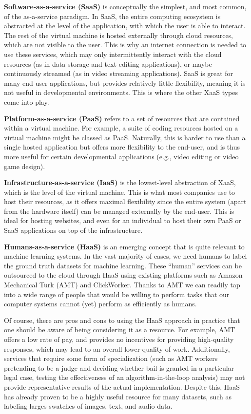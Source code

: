{{{{{\textbf{Software-as-a-service (SaaS)} is conceptually the simplest, and most common, of the as-a-service paradigm. In SaaS, the entire computing ecosystem is abstracted at the level of the application, with which the user is able to interact. The rest of the virtual machine is hosted externally through cloud resources, which are not visible to the user. This is why an internet connection is needed to use these services, which may only intermittently interact with the cloud resources (as in data storage and text editing applications), or maybe continuously streamed (as in video streaming applications). SaaS is great for many end-user applications, but provides relatively little flexibility, meaning it is not useful in developmental environments. This is where the other XaaS types come into play.

\textbf{Platform-as-a-service (PaaS)} refers to a set of resources that are contained within a virtual machine. For example, a suite of coding resources hosted on a virtual machine might be classed as PaaS. Naturally, this is harder to use than a single hosted application but offers more flexibility to the end-user, and is thus more useful for certain developmental applications (e.g., video editing or video game design).

\textbf{Infrastructure-as-a-service (IaaS)} is the lowest-level abstraction of XaaS, which is the level of the virtual machine. This is what most companies use to host their resources, as it offers maximal flexibility since the entire system (apart from the hardware itself) can be managed externally by the end-user. This is ideal for hosting websites, and even for an individual to host their own PaaS or SaaS applications on top of the infrastructure.

\textbf{Humans-as-a-service (HaaS)} is an emerging concept that is quite relevant to machine learning systems. In the vast majority of cases, we need humans to label the ground truth datasets for machine learning. These “human” services can be outsourced to the cloud through HaaS using existing platforms such as Amazon Mechanical Turk (AMT) and ClickWorker. Thanks to AMT we can readily tap into a wide range of people that would be willing to perform tasks that our computer systems cannot (yet) perform as efficiently as humans.

Of course, there are pros and cons to using the HaaS approach in practice that one should be aware of being considering it as a resource. For example, AMT offers a low rate of pay, and provides no incentives for providing high-quality responses, which may lead to an overall lower-quality of work. Additionally, services that require some form of specialization (such as AMT workers pretending to be a judge and deciding whether bail is granted in a particular legal case, testing the effectiveness of an algorithm-in-the-loop analysis) may not provide representative results of the actual implementation. Despite this, HaaS has already proven to be a highly useful resource for many datasets, such as labeling larges swatches of images, text, and audio data.

}}}}}
